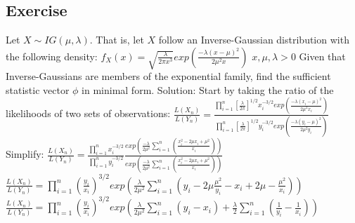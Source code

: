 \documentclass{article}
\begin{document}
\subsection{Exercise} 
Let $X \sim IG(\mu, \lambda)$. That is, let $X$ follow an Inverse-Gaussian distribution with the following density: \newline
\newline
$f_X(x) = \sqrt{\frac{\lambda}{2 \pi x^3}} exp(\frac{- \lambda(x - \mu)^2}{2 \mu^2 x})$ \newline
$x, \mu, \lambda > 0$ \newline
\newline
Given that Inverse-Gaussians are members of the exponential family, find the sufficient statistic vector $\phi$ in minimal form. \newline
\newline
Solution: \newline
\newline
Start by taking the ratio of the likelihoods of two sets of observations: \newline
\newline
\Large
$\frac{L(X_n)}{L(Y_n)} = \frac{\prod_{i=1}^{n}[\frac{\lambda}{2 \pi}]^{1/2} x_i^{-3/2} exp(\frac{- \lambda(x_i - \mu)^2}{2 \mu^2 x_i})}{\prod_{i=1}^{n}[\frac{\lambda}{2 \pi}]^{1/2} y_i^{-3/2} exp(\frac{- \lambda(y_i - \mu)^2}{2 \mu^2 y_i})}$ \newline
\newline
\normalsize 
Simplify: \newline
\newline
\Large
$\frac{L(X_n)}{L(Y_n)} = \frac{\prod_{i=1}^{n} x_i^{-3/2}}{\prod_{i=1}^{n} y_i^{-3/2}}\frac{exp(\frac{- \lambda}{2 \mu^2} \sum_{i=1}^{n} (\frac{x_i^2 - 2 \mu x_i + \mu^2}{x_i}))}{exp(\frac{- \lambda}{2 \mu^2} \sum_{i=1}^{n} (\frac{x_i^2 - 2 \mu x_i + \mu^2}{x_i}))}$ \newline 
\newline
\newline
\normalsize
$\frac{L(X_n)}{L(Y_n)} = \prod_{i=1}^{n} (\frac{y_i}{x_i})^{3/2} exp(\frac{\lambda}{2 \mu^2} \sum_{i=1}^{n} (y_i - 2\mu \frac{\mu^2}{y_i} - x_i + 2\mu - \frac{\mu^2}{x_i}))$ \newline 
\newline
$\frac{L(X_n)}{L(Y_n)} = \prod_{i=1}^{n} (\frac{y_i}{x_i})^{3/2} exp(\frac{\lambda}{2 \mu^2} \sum_{i=1}^{n}(y_i - x_i) + \frac{\lambda}{2} \sum_{i=1}^{n}(\frac{1}{y_i} - \frac{1}{x_i}))$ \newline
\newline
\end{document}
